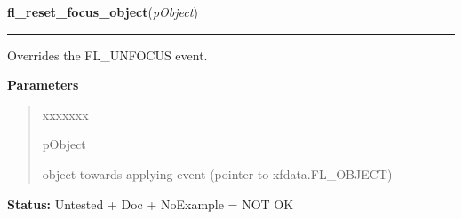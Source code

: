 \hspace{.8\funcindent}\begin{boxedminipage}{\funcwidth}

    \raggedright \textbf{fl\_reset\_focus\_object}(\textit{pObject})

    \vspace{-1.5ex}

    \rule{\textwidth}{0.5\fboxrule}
\setlength{\parskip}{2ex}
    Overrides the FL\_UNFOCUS event.

\setlength{\parskip}{1ex}
      \textbf{Parameters}
      \vspace{-1ex}

      \begin{quote}
        \begin{Ventry}{xxxxxxx}

          \item[pObject]

          object towards applying event (pointer to xfdata.FL\_OBJECT)

        \end{Ventry}

      \end{quote}

\textbf{Status:} Untested + Doc + NoExample = NOT OK



    \end{boxedminipage}

    \label{xformslib:library:fl_set_form_atclose}

    \vspace{0.5ex}

